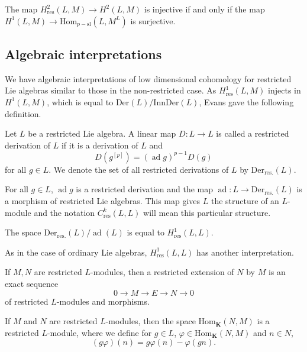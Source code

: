 \documentclass[11pt, twoside]{article}
\DeclareMathOperator{\ad}{ad}
\begin{document}
\begin{prop}\label{propinj}
    The map $H^2_\mathrm{res}(L,M)\to H^2(L,M) $ is injective if and only if the map $H^1(L,M)\to \mathrm{Hom}_{p-\mathrm{sl}}(L,M^L) $ is surjective. 
\end{prop}

\subsection{Algebraic interpretations}

We have algebraic interpretations of low dimensional cohomology for restricted Lie algebras similar to those in the non-restricted case. As $H_\mathrm{res}^1(L,M) $ injects in $H^1(L,M) $, which is equal to $\mathrm{Der}(L)/\mathrm{InnDer}(L) $, Evans gave the following definition.

\begin{defi}\cite{E96}
    Let $L$ be a restricted Lie algebra. A linear map $D:L\to L$ is called a restricted derivation of $L$ if it is a derivation of $L$ and $$D(g^{[p]})=(\ad g)^{p-1}D(g) $$ for all $g\in L$. We denote the set of all restricted derivations of $L$ by $\mathrm{Der}_\mathrm{res.}(L)$.
\end{defi}

For all $g\in L$, $\ad g$ is a restricted derivation and the map $\ad:L\to \mathrm{Der}_\mathrm{res.}(L) $ is a morphism of restricted Lie algebras. This map gives $L$ the structure of an $L$-module and the notation $C_\mathrm{res}^k(L,L) $ will mean this particular structure. 

\begin{prop}
    The space $\mathrm{Der}_\mathrm{res.}(L)/\ad (L) $ is equal to $H_\mathrm{res}^1(L,L)$.
\end{prop}

 As in the case of ordinary Lie algebras, $H_\mathrm{res}^1(L,L)$ has another interpretation.

\begin{defi}\cite{E96}
    If $M,N$ are restricted $L$-modules, then a restricted extension of $N$ by $M$ is an exact sequence $$0\to M\to E\to N\to 0 $$ of restricted $L$-modules and morphisms.
\end{defi}

\begin{lem}\cite{E96}
    If $M$ and $N$ are restricted $L$-modules, then the space $\mathrm{Hom}_\mathbf{K}(N,M)$ is a restricted $L$-module, where we define for $g\in L$, $\varphi\in \mathrm{Hom}_\mathbf{K}(N,M)$ and $n\in N$,  $$(g\varphi)(n)= g\varphi(n)- \varphi(gn).$$
\end{lem} 
\end{document}
